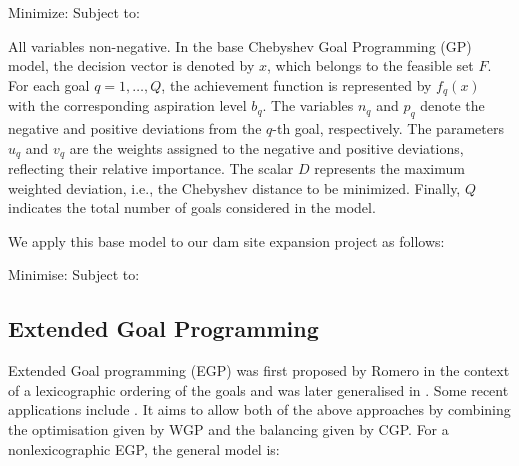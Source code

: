 Minimize:
            \EqCGPMinFunctionSix
Subject to:
            \EqGGPMinFunctionSubTwo
            \EqCGPConstraintSeven
            \EqCGPConstraintEight
            \EqGGPMinFunctionSubFour
            \EqCGPConstraintNine

All variables non-negative. In the base Chebyshev Goal Programming (GP) model, the decision vector is denoted by $x$, which belongs to the feasible set $F$. For each goal $q=1,\dots,Q$, the achievement function is represented by $f_q(x)$ with the corresponding aspiration level $b_q$. The variables $n_q$ and $p_q$ denote the negative and positive deviations from the $q$-th goal, respectively. The parameters $u_q$ and $v_q$ are the weights assigned to the negative and positive deviations, reflecting their relative importance. The scalar $D$ represents the maximum weighted deviation, i.e., the Chebyshev distance to be minimized. Finally, $Q$ indicates the total number of goals considered in the model.

We apply this base model to our dam site expansion project as follows:

Minimise:
            \EqCGPMinFunctionSix
Subject to:
            \EqDamHeightConstraintTwelve
            \EqDamCapacityConstraintThirteen
            \EqReservoirAreaConstraintFourteen
            \EqTemperatureConstraintFifteen
            \EqPopulationConstraintSixteen
            \EqRainfallConstraintSeventeen
            \EqResidenceConstraintEighteen
            \EqFarmlandDistanceConstraintNineteen
            \EqNearestRoadConstraintTwenty
            \EqFarmlandAreaConstraintTwentyOne
            \EqSelectThreeDamsTwentyTwo
            \EqBudgetConstraintTwentyThree
            \EqDConstraintOneNTwentyFour
            \EqDConstraintTwoNTwentyFive
            \EqDConstraintThreeNTwentySix
            \EqDConstraintFourNTwentySix
            \EqDConstraintFiveNTwentySeven
            \EqDConstraintSixNTwentyEight
            \EqDConstraintSevenNTwentyNine
            \EqDConstraintEightNThirty
            \EqDConstraintNineNThirtyOne
            \EqDConstraintTenNThirtyTwo

\subsection{Extended Goal Programming}  
Extended Goal programming (EGP) was first proposed by Romero \cite{ROMERO2001} in the context of a lexicographic ordering of the goals and was later generalised in \cite{ROMERO2004}. Some recent applications include \cite{Guijarro2018,Pal2014}. It aims to allow both of the above approaches by combining the optimisation given by WGP and the balancing given by CGP. For a nonlexicographic EGP, the general model is:


